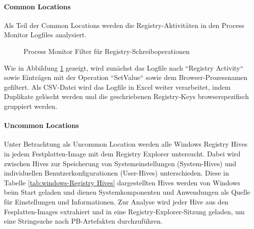 \paragraph*{Common Locations}
Als Teil der Common Locations werden die Registry-Aktivitäten in den Process Monitor Logfiles analysiert.
\begin{figure}[h!]
	\centerline{}
	\caption{Process Monitor Filter für Registry-Schreiboperationen}
	\label{img:procmon-setvalue-filter}
\end{figure}
Wie in Abbildung \ref{img:procmon-setvalue-filter} gezeigt, wird zunächst das Logfile nach ``Registry Activity`` sowie Einträgen mit der Operation ``SetValue`` sowie dem Browser-Prozessnamen gefiltert.
Als CSV-Datei wird das Logfile in Excel weiter verarbeitet, indem Duplikate gelöscht werden und die geschriebenen Registry-Keys browserspezifisch gruppiert werden.
	
\paragraph*{Uncommon Locations}
Unter Betrachtung als Uncommon Location werden alle Windows Registry Hives in jedem Festplatten-Image mit dem Registry Explorer untersucht.
Dabei wird zwischen Hives zur Speicherung von Systemeinstellungen (System-Hives) und individuellen Benutzerkonfigurationen (User-Hives) unterschieden. Diese in Tabelle \ref{tab:windows-Registry Hives} dargestellten Hives werden von Windows beim Start geladen und dienen Systemkomponenten und Anwendungen als Quelle für Einstellungen und Informationen. \cite{Haircutfish.04.11.2022}
Zur Analyse wird jeder Hive aus den Fesplatten-Images extrahiert und in eine Registry-Explorer-Sitzung geladen, um eine Stringsuche nach PB-Artefakten durchzuführen.

